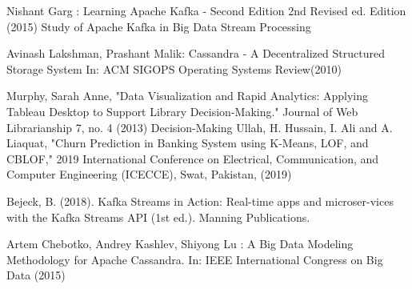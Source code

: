\documentclass{article}
\begin{document}
 \begin{thebibliography}{8}
 Nishant Garg : Learning Apache Kafka - Second Edition 2nd Revised ed. Edition (2015)
\bibitem{}
Study of Apache Kafka in Big Data Stream Processing

Avinash Lakshman, Prashant  Malik: Cassandra - A Decentralized Structured Storage System In: ACM SIGOPS Operating Systems Review(2010) 

Murphy, Sarah Anne, "Data Visualization and Rapid Analytics: Applying Tableau Desktop to Support Library Decision-Making." Journal of Web Librarianship 7, no. 4 (2013) Decision-Making
Ullah, H. Hussain, I. Ali and A. Liaquat, "Churn Prediction in Banking System using K-Means, LOF, and CBLOF," 2019 International Conference on Electrical, Communication, and Computer Engineering (ICECCE), Swat, Pakistan, (2019)


Bejeck, B. (2018). Kafka Streams in Action:  Real-time apps and microser-vices with the Kafka Streams API (1st ed.). Manning Publications.

Artem Chebotko, Andrey Kashlev, Shiyong Lu : A Big Data Modeling Methodology for Apache Cassandra. In: IEEE International Congress on Big Data (2015)

\end{thebibliography}
\end{document}
